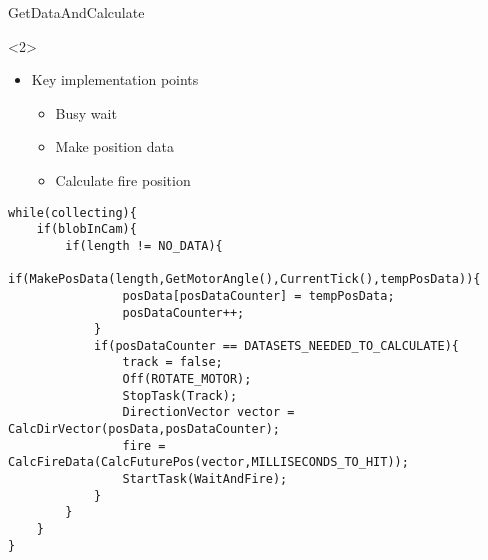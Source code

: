 \begin{frame}[fragile]{GetDataAndCalculate}
\begin{onlyenv}<2>
\begin{itemize}
	\item Key implementation points
		\begin{itemize}
  			\item Busy wait 
  			\item Make position data
  			\item Calculate fire position 
		\end{itemize}
\end{itemize}
\begin{center}
\begin{minipage}[H]{0.9\linewidth}
\begin{lstlisting}
while(collecting){
	if(blobInCam){
        if(length != NO_DATA){
            if(MakePosData(length,GetMotorAngle(),CurrentTick(),tempPosData)){
            	posData[posDataCounter] = tempPosData;
                posDataCounter++;
            }
            if(posDataCounter == DATASETS_NEEDED_TO_CALCULATE){
				track = false;
                Off(ROTATE_MOTOR); 
                StopTask(Track);
                DirectionVector vector = CalcDirVector(posData,posDataCounter);
                fire = CalcFireData(CalcFuturePos(vector,MILLISECONDS_TO_HIT));
                StartTask(WaitAndFire);
            }
    	}
	}
}
\end{lstlisting} 
\end{minipage}
\end{center}
\end{onlyenv}
\end{frame}

